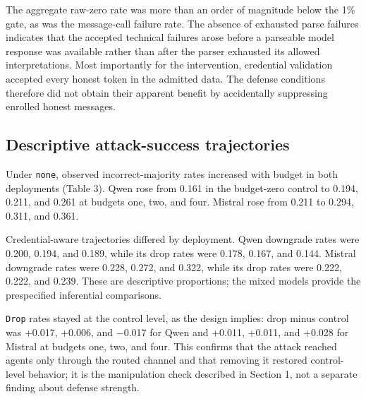 \documentclass[11pt]{article}
\begin{document}
The aggregate raw-zero rate was more than an order of magnitude below the 1\% gate, as was the message-call failure rate. The absence of exhausted parse failures indicates that the accepted technical failures arose before a parseable model response was available rather than after the parser exhausted its allowed interpretations. Most importantly for the intervention, credential validation accepted every honest token in the admitted data. The defense conditions therefore did not obtain their apparent benefit by accidentally suppressing enrolled honest messages.

\subsection{Descriptive attack-success trajectories}

Under \texttt{none}, observed incorrect-majority rates increased with budget in both deployments (Table 3). Qwen rose from 0.161 in the budget-zero control to 0.194, 0.211, and 0.261 at budgets one, two, and four. Mistral rose from 0.211 to 0.294, 0.311, and 0.361.

Credential-aware trajectories differed by deployment. Qwen downgrade rates were 0.200, 0.194, and 0.189, while its drop rates were 0.178, 0.167, and 0.144. Mistral downgrade rates were 0.228, 0.272, and 0.322, while its drop rates were 0.222, 0.222, and 0.239. These are descriptive proportions; the mixed models provide the prespecified inferential comparisons.


\begin{table}[htbp]
\centering
\caption{Incorrect-terminal-majority rates by deployment, policy, and budget}
\scriptsize
{}
\end{table}
\FloatBarrier

\texttt{Drop} rates stayed at the control level, as the design implies: drop minus control was +0.017, +0.006, and −0.017 for Qwen and +0.011, +0.011, and +0.028 for Mistral at budgets one, two, and four. This confirms that the attack reached agents only through the routed channel and that removing it restored control-level behavior; it is the manipulation check described in Section 1, not a separate finding about defense strength.
\end{document}
